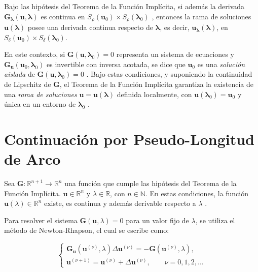 \begin{theorem}
    Bajo las hipótesis del Teorema de la Función Implícita, si además la
    derivada $\mathbf{G}_{\boldsymbol{\lambda}}(\mathbf{u},\boldsymbol{\lambda})$ es continua
    en $S_\rho(\mathbf{u}_0) \times S_\rho(\boldsymbol{\lambda}_0)$ \cite{Doedel2007},
    entonces la rama de soluciones $\mathbf{u}(\boldsymbol{\lambda})$ posee una derivada
    continua respecto de $\boldsymbol{\lambda}$, es decir,
    $\mathbf{u}_{\boldsymbol{\lambda}}(\boldsymbol{\lambda})$, en
    $S_\delta(\mathbf{u}_0) \times S_\delta(\boldsymbol{\lambda}_0)$.
    \label{th:Differentiation}
\end{theorem}

En este contexto, si $\mathbf{G}(\mathbf{u},\boldsymbol{\lambda}_0)=0$ representa un sistema
de ecuaciones y $\mathbf{G}_{\mathbf{u}}(\mathbf{u}_0,\boldsymbol{\lambda}_0)$ es invertible con
inversa acotada, se dice que $\mathbf{u}_0$ es una \emph{solución aislada} de
$\mathbf{G}(\mathbf{u},\boldsymbol{\lambda}_0)=0$ \cite{Doedel2007}. Bajo estas condiciones,
y suponiendo la continuidad de Lipschitz de $\mathbf{G}$, el Teorema de la Función Implícita
garantiza la existencia de una \emph{rama de soluciones}
$\mathbf{u} = \mathbf{u}(\boldsymbol{\lambda})$ definida localmente, con
$\mathbf{u}(\boldsymbol{\lambda}_0)=\mathbf{u}_0$ y única en un entorno de
$\boldsymbol{\lambda}_0$ \cite{Doedel2007}.



\section{Continuación por Pseudo-Longitud de Arco}

Sea $ \mathbf{G} : \mathbb{R}^{n+1} \to \mathbb{R}^n$ una función que cumple
las hipótesis del Teorema de la Función Implícita. 
$ \mathbf{u} \in \mathbb{R}^n $ y $ \lambda \in \mathbb{R} $, con $n \in \mathbb{N}$.
En estas condiciones, la función $ \mathbf{u}(\lambda) \in \mathbb{R}^n $ existe,
es continua y además derivable respecto a $\lambda$ \cite{Doedel2007,Allgower1990}.

Para resolver el sistema $ \mathbf{G}(\mathbf{u}, \lambda) = 0 $ para un valor fijo de
$ \lambda $, se utiliza el método de Newton-Rhapson, el cual se escribe como:

\begin{equation}
    \begin{cases}
        \mathbf{G}_{\mathbf{u}}(\mathbf{u}^{(\nu)}, \lambda)
        \Delta \mathbf{u}^{(\nu)} = - \mathbf{G}(\mathbf{u}^{(\nu)}, \lambda), \\
        \mathbf{u}^{(\nu + 1)} = \mathbf{u}^{(\nu)} + \Delta \mathbf{u}^{(\nu)},
        \qquad \nu = 0, 1, 2, \dots
    \end{cases}
    \label{eq:NR_parameter}
\end{equation}

